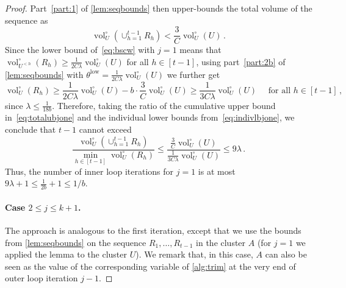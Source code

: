 \documentclass[epsfig,letter,11pt]{article}
\numberwithin{equation}{section}
\newcommand{\unvolc}[2]{\operatorname{vol}_{#2}^\circ (#1)}
\DeclareMathOperator*{\low}{low}
\begin{document}
\begin{proof}
	Part~\eqref{part:1} of \cref{lem:seqbounds} then upper-bounds the total volume of the sequence as
	\begin{equation}
		\label{eq:totalubjone}
		\unvolc{\cup_{h=1}^{t-1} R_h}{U} < \frac{3}{C}\unvolc{U}{U} \, .
	\end{equation}
	Since the lower bound of~\eqref{eq:bscw} with $j=1$ means that $ \unvolc{R_h}{U^{<h}} \ge \frac{1}{2C\lambda}\unvolc{U}{U}$ for all $h \in [t-1]$, using part~\eqref{part:2b} of \cref{lem:seqbounds} with $\theta^{\low} =\frac{1}{2C\lambda}\unvolc{U}{U}$ we further get
		\begin{equation}
		\label{eq:indivlbjone}
		\unvolc{R_h}{U} \ge \frac{1}{2C\lambda}\unvolc{U}{U} - b\cdot \frac{3}{C}\unvolc{U}{U}  \ge  \frac{1}{3C\lambda}\unvolc{U}{U} \quad \text{ for all $h \in [t-1]$}\, ,
	\end{equation}
since  $\lambda \le \frac{1}{18b}$.
	Therefore, taking the ratio of the cumulative upper bound in~\eqref{eq:totalubjone} and the individual lower bounds from~\eqref{eq:indivlbjone}, we conclude that $t-1$ cannot exceed
	\begin{equation*}
		\frac{\unvolc{\cup_{h=1}^{t-1} R_h}{U}}{\min_{h \in [t-1]}\unvolc{R_h}{U}} \le \frac{\frac{3}{C}\unvolc{U}{U}}{\frac{1}{3C\lambda}\unvolc{U}{U}} \le 9 \lambda \, .
	\end{equation*}
Thus, the number of inner loop iterations for $j=1$ is at most $9\lambda +1 \le \frac{1}{2b}+1 \le 1/b$.
	
	\paragraph{Case $2 \le j \le k+1$.} The approach is analogous to the first iteration, except that we use the bounds from \cref{lem:seqbounds} on the sequence $R_1,\dots,R_{t-1}$ in the cluster $A$ (for $j=1$ we applied the lemma to the cluster $U$). We remark that, in this case, $A$ can also be seen as the value of the corresponding variable of \cref{alg:trim} at the very end of outer loop iteration $j-1$.
	

\end{proof}
\end{document}
